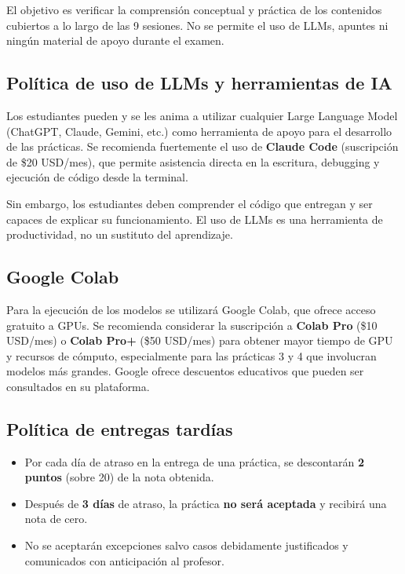 \documentclass[11pt,a4paper]{article}
\begin{document}
El objetivo es verificar la comprensi\'on conceptual y pr\'actica de los contenidos cubiertos a lo largo de las 9 sesiones. No se permite el uso de LLMs, apuntes ni ning\'un material de apoyo durante el examen.

\subsection*{Pol\'itica de uso de LLMs y herramientas de IA}

Los estudiantes pueden y se les anima a utilizar cualquier Large Language Model (ChatGPT, Claude, Gemini, etc.) como herramienta de apoyo para el desarrollo de las pr\'acticas. Se recomienda fuertemente el uso de \textbf{Claude Code} (suscripci\'on de \$20 USD/mes), que permite asistencia directa en la escritura, debugging y ejecuci\'on de c\'odigo desde la terminal.

Sin embargo, los estudiantes deben comprender el c\'odigo que entregan y ser capaces de explicar su funcionamiento. El uso de LLMs es una herramienta de productividad, no un sustituto del aprendizaje.

\subsection*{Google Colab}

Para la ejecuci\'on de los modelos se utilizar\'a Google Colab, que ofrece acceso gratuito a GPUs. Se recomienda considerar la suscripci\'on a \textbf{Colab Pro} (\$10 USD/mes) o \textbf{Colab Pro+} (\$50 USD/mes) para obtener mayor tiempo de GPU y recursos de c\'omputo, especialmente para las pr\'acticas 3 y 4 que involucran modelos m\'as grandes. Google ofrece descuentos educativos que pueden ser consultados en su plataforma.

\subsection*{Pol\'itica de entregas tard\'ias}

\begin{itemize}[leftmargin=2cm]
    \item Por cada d\'ia de atraso en la entrega de una pr\'actica, se descontar\'an \textbf{2 puntos} (sobre 20) de la nota obtenida.
    \item Despu\'es de \textbf{3 d\'ias} de atraso, la pr\'actica \textbf{no ser\'a aceptada} y recibir\'a una nota de cero.
    \item No se aceptar\'an excepciones salvo casos debidamente justificados y comunicados con anticipaci\'on al profesor.
\end{itemize}
\end{document}
